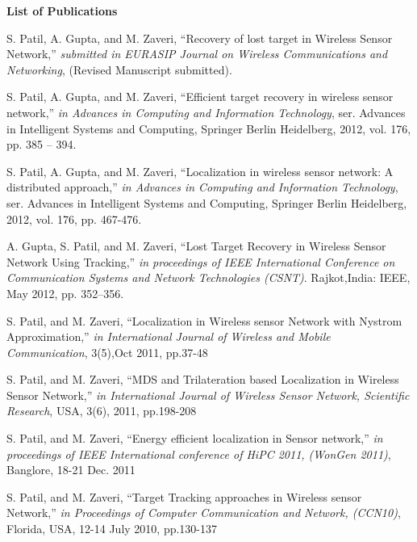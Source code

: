\label{page:pub}
\begin{center}
\textbf{\Large List of Publications}
\end{center}
\vspace*{25pt}
\begin{enumerate}[{[1]}]

\item S. Patil, A. Gupta, and M. Zaveri, ``Recovery of lost target in Wireless Sensor Network,'' \textit{submitted in EURASIP Journal on Wireless Communications and Networking}, (Revised Manuscript submitted).

\item S. Patil, A. Gupta, and M. Zaveri, ``Efficient target recovery in wireless sensor network,” \textit{in Advances in Computing and Information Technology}, ser. Advances in Intelligent Systems and Computing, Springer Berlin Heidelberg, 2012, vol. 176, pp. 385 – 394.

\item S. Patil, A. Gupta, and M. Zaveri, ``Localization in wireless sensor network: A distributed approach,” \textit{in Advances in Computing and Information Technology}, ser. Advances in Intelligent Systems and Computing, Springer Berlin Heidelberg, 2012, vol. 176, pp. 467-476.

\item A. Gupta, S. Patil, and M. Zaveri, ``Lost Target Recovery in Wireless Sensor Network Using Tracking,'' \textit{in proceedings of IEEE International Conference on Communication Systems and Network Technologies (CSNT)}. Rajkot,India: IEEE, May 2012, pp. 352–356.

\item S. Patil, and M. Zaveri, ``Localization in Wireless sensor Network with Nystrom Approximation,'' \textit{in International Journal of Wireless and Mobile Communication}, 3(5),Oct 2011, pp.37-48

\item S. Patil, and M. Zaveri, ``MDS and Trilateration based Localization in Wireless Sensor Network,'' \textit{in International Journal of Wireless Sensor Network, Scientific Research}, USA, 3(6), 2011, pp.198-208

\item S. Patil, and M. Zaveri, ``Energy efficient localization in Sensor network,'' \textit{in proceedings of IEEE International conference of HiPC 2011, (WonGen 2011)}, Banglore, 18-21 Dec. 2011

\item S. Patil, and M. Zaveri, ``Target Tracking approaches in Wireless sensor Network,'' \textit{in Proceedings of Computer Communication and Network, (CCN10)}, Florida, USA, 12-14 July 2010, pp.130-137

\end{enumerate}

\newpage
